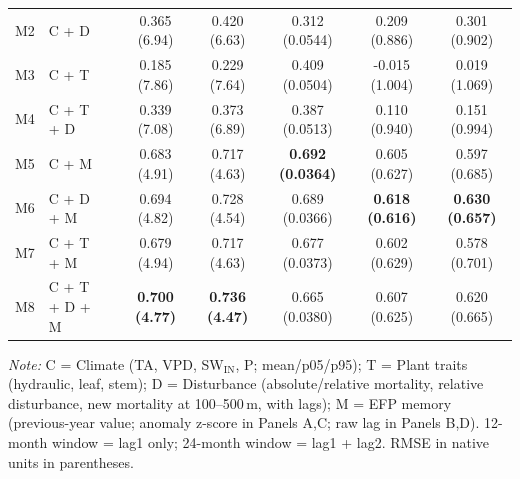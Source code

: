 \begin{table}[htbp]
\begin{tabular}{llcccccc}
M2 & C + D &  & 0.365 (6.94) & 0.420 (6.63) & 0.312 (0.0544) & 0.209 (0.886) & 0.301 (0.902) \\
M3 & C + T &  & 0.185 (7.86) & 0.229 (7.64) & 0.409 (0.0504) & -0.015 (1.004) & 0.019 (1.069) \\
M4 & C + T + D &  & 0.339 (7.08) & 0.373 (6.89) & 0.387 (0.0513) & 0.110 (0.940) & 0.151 (0.994) \\
M5 & C + M &  & 0.683 (4.91) & 0.717 (4.63) & \textbf{0.692 (0.0364)} & 0.605 (0.627) & 0.597 (0.685) \\
M6 & C + D + M &  & 0.694 (4.82) & 0.728 (4.54) & 0.689 (0.0366) & \textbf{0.618 (0.616)} & \textbf{0.630 (0.657)} \\
M7 & C + T + M &  & 0.679 (4.94) & 0.717 (4.63) & 0.677 (0.0373) & 0.602 (0.629) & 0.578 (0.701) \\
M8 & C + T + D + M &  & \textbf{0.700 (4.77)} & \textbf{0.736 (4.47)} & 0.665 (0.0380) & 0.607 (0.625) & 0.620 (0.665) \\
\midrule
\bottomrule
\end{tabular}
\vspace{2pt}
\begin{minipage}{\linewidth}
\footnotesize
\textit{Note:} C = Climate (TA, VPD, SW$_\mathrm{IN}$, P; mean/p05/p95); T = Plant traits (hydraulic, leaf, stem); D = Disturbance (absolute/relative mortality, relative disturbance, new mortality at 100--500\,m, with lags); M = EFP memory (previous-year value; anomaly z-score in Panels A,C; raw lag in Panels B,D). 12-month window = lag1 only; 24-month window = lag1 + lag2. RMSE in native units in parentheses.
\end{minipage}
\end{table}

